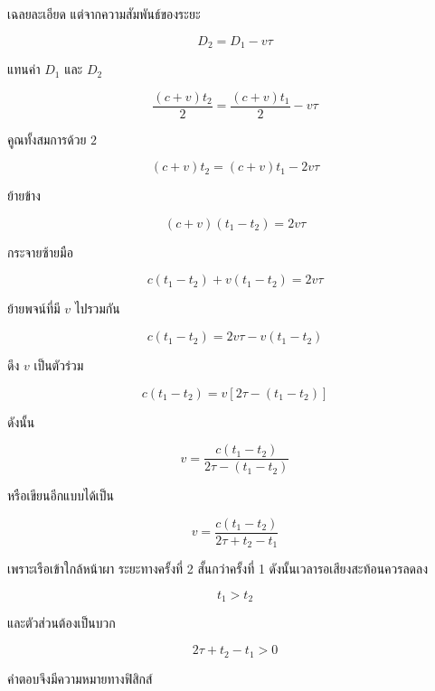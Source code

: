 \begin{examplebox}{เฉลยละเอียด}
แต่จากความสัมพันธ์ของระยะ

\[
D_2=D_1-v\tau
\]

แทนค่า $D_1$ และ $D_2$

\[
\frac{(c+v)t_2}{2}
=
\frac{(c+v)t_1}{2}
-
v\tau
\]

คูณทั้งสมการด้วย $2$

\[
(c+v)t_2=(c+v)t_1-2v\tau
\]

ย้ายข้าง

\[
(c+v)(t_1-t_2)=2v\tau
\]

กระจายซ้ายมือ

\[
c(t_1-t_2)+v(t_1-t_2)=2v\tau
\]

ย้ายพจน์ที่มี $v$ ไปรวมกัน

\[
c(t_1-t_2)=2v\tau-v(t_1-t_2)
\]

ดึง $v$ เป็นตัวร่วม

\[
c(t_1-t_2)=v\left[2\tau-(t_1-t_2)\right]
\]

ดังนั้น

\[
v=
\frac{c(t_1-t_2)}
{2\tau-(t_1-t_2)}
\]

หรือเขียนอีกแบบได้เป็น

\[
\boxed{
v=
\frac{c(t_1-t_2)}
{2\tau+t_2-t_1}
}
\]

\begin{tcolorbox}[title=ตรวจความสมเหตุสมผล]
เพราะเรือเข้าใกล้หน้าผา ระยะทางครั้งที่ 2 สั้นกว่าครั้งที่ 1 ดังนั้นเวลารอเสียงสะท้อนควรลดลง

\[
t_1>t_2
\]

และตัวส่วนต้องเป็นบวก

\[
2\tau+t_2-t_1>0
\]

คำตอบจึงมีความหมายทางฟิสิกส์
\end{tcolorbox}
\end{examplebox}
